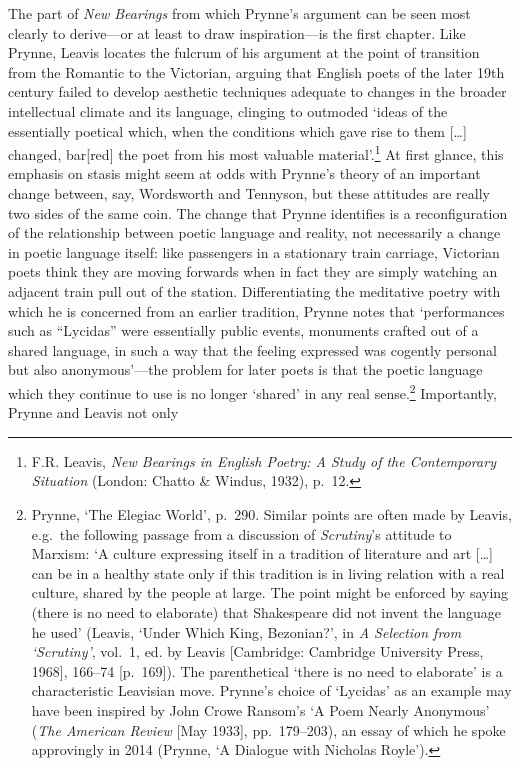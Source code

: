 \documentclass[]{article}
\begin{document}
\noindent The part of \emph{New Bearings} from which Prynne's argument
can be seen most clearly to derive---or at least to draw
inspiration---is the first chapter. Like Prynne, Leavis locates the
fulcrum of his argument at the point of transition from the Romantic to
the Victorian, arguing that English poets of the later 19th century
failed to develop aesthetic techniques adequate to changes in the
broader intellectual climate and its language, clinging to outmoded
`ideas of the essentially poetical which, when the conditions which gave
rise to them {[}\ldots{}{]} changed, bar{[}red{]} the poet from his most
valuable material'.\footnote{F.R. Leavis, \emph{New Bearings in English
  Poetry: A Study of the Contemporary Situation} (London: Chatto \&
  Windus, 1932), p.~12.} At first glance, this emphasis on stasis might
seem at odds with Prynne's theory of an important change between, say,
Wordsworth and Tennyson, but these attitudes are really two sides of the
same coin. The change that Prynne identifies is a reconfiguration of the
relationship between poetic language and reality, not necessarily a
change in poetic language itself: like passengers in a stationary train
carriage, Victorian poets think they are moving forwards when in fact
they are simply watching an adjacent train pull out of the station.
Differentiating the meditative poetry with which he is concerned from an
earlier tradition, Prynne notes that `performances such as ``Lycidas''
were essentially public events, monuments crafted out of a shared
language, in such a way that the feeling expressed was cogently personal
but also anonymous'---the problem for later poets is that the poetic
language which they continue to use is no longer `shared' in any real
sense.\footnote{Prynne, `The Elegiac World', p.~290. Similar points are
  often made by Leavis, e.g.~the following passage from a discussion of
  \emph{Scrutiny}'s attitude to Marxism: `A culture expressing itself in
  a tradition of literature and art {[}\ldots{}{]} can be in a healthy
  state only if this tradition is in living relation with a real
  culture, shared by the people at large. The point might be enforced by
  saying (there is no need to elaborate) that Shakespeare did not invent
  the language he used' (Leavis, `Under Which King, Bezonian?', in
  \emph{A Selection from `Scrutiny'}, vol.~1, ed. by Leavis
  {[}Cambridge: Cambridge University Press, 1968{]}, 166--74
  {[}p.~169{]}). The parenthetical `there is no need to elaborate' is a
  characteristic Leavisian move. Prynne's choice of `Lycidas' as an
  example may have been inspired by John Crowe Ransom's `A Poem Nearly
  Anonymous' (\emph{The American Review} {[}May 1933{]}, pp.~179--203),
  an essay of which he spoke approvingly in 2014 (Prynne, `A Dialogue
  with Nicholas Royle').} Importantly, Prynne and Leavis not only
\end{document}
